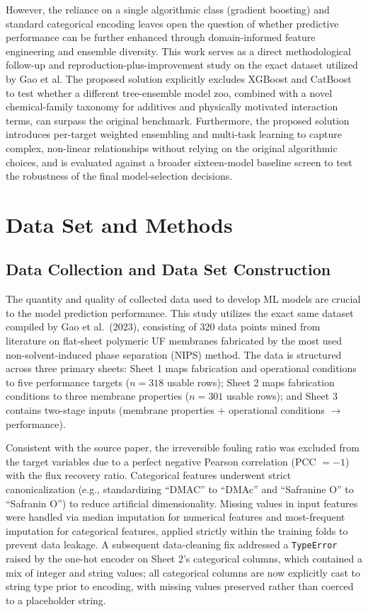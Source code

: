 \documentclass[11pt]{article}
\begin{document}
However, the reliance on a single algorithmic class (gradient boosting) and standard categorical encoding leaves open the question of whether predictive performance can be further enhanced through domain-informed feature engineering and ensemble diversity. This work serves as a direct methodological follow-up and reproduction-plus-improvement study on the exact dataset utilized by Gao et al. The proposed solution explicitly excludes XGBoost and CatBoost to test whether a different tree-ensemble model zoo, combined with a novel chemical-family taxonomy for additives and physically motivated interaction terms, can surpass the original benchmark. Furthermore, the proposed solution introduces per-target weighted ensembling and multi-task learning to capture complex, non-linear relationships without relying on the original algorithmic choices, and is evaluated against a broader sixteen-model baseline screen to test the robustness of the final model-selection decisions.

\section{Data Set and Methods}

\subsection{Data Collection and Data Set Construction}

The quantity and quality of collected data used to develop ML models are crucial to the model prediction performance. This study utilizes the exact same dataset compiled by Gao et al.\ (2023), consisting of 320 data points mined from literature on flat-sheet polymeric UF membranes fabricated by the most used non-solvent-induced phase separation (NIPS) method. The data is structured across three primary sheets: Sheet 1 maps fabrication and operational conditions to five performance targets ($n = 318$ usable rows); Sheet 2 maps fabrication conditions to three membrane properties ($n = 301$ usable rows); and Sheet 3 contains two-stage inputs (membrane properties + operational conditions $\rightarrow$ performance).

Consistent with the source paper, the irreversible fouling ratio was excluded from the target variables due to a perfect negative Pearson correlation (PCC $= -1$) with the flux recovery ratio. Categorical features underwent strict canonicalization (e.g., standardizing ``DMAC'' to ``DMAc'' and ``Safranine O'' to ``Safranin O'') to reduce artificial dimensionality. Missing values in input features were handled via median imputation for numerical features and most-frequent imputation for categorical features, applied strictly within the training folds to prevent data leakage. A subsequent data-cleaning fix addressed a \texttt{TypeError} raised by the one-hot encoder on Sheet 2's categorical columns, which contained a mix of integer and string values; all categorical columns are now explicitly cast to string type prior to encoding, with missing values preserved rather than coerced to a placeholder string.
\end{document}
